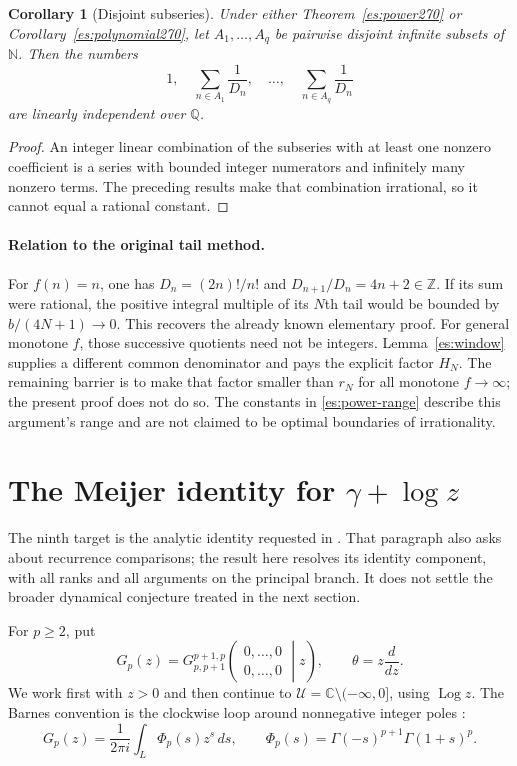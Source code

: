 \documentclass[11pt,a4paper]{article}
\numberwithin{equation}{section}
\newtheorem{corollary}[theorem]{Corollary}
\theoremstyle{definition}
\theoremstyle{remark}
\DeclareMathOperator{\Log}{Log}
\begin{document}
\begin{corollary}[Disjoint subseries]
\label{es:subseries270}
Under either Theorem~\ref{es:power270} or
Corollary~\ref{es:polynomial270}, let $A_1,\ldots,A_q$ be pairwise
disjoint infinite subsets of $\mathbb N$.  Then the numbers
\[
 1,\quad \sum_{n\in A_1}\frac1{D_n},\quad\ldots,\quad
 \sum_{n\in A_q}\frac1{D_n}
\]
are linearly independent over $\mathbb Q$.
\end{corollary}
\begin{proof}
An integer linear combination of the subseries with at least one
nonzero coefficient is a series with bounded integer numerators
and infinitely many nonzero terms.  The preceding results make
that combination irrational, so it cannot equal a rational constant.
\end{proof}

\paragraph{Relation to the original tail method.}
For $f(n)=n$, one has $D_n=(2n)!/n!$ and
$D_{n+1}/D_n=4n+2\in\mathbb Z$.  If its sum were rational, the
positive integral multiple of its $N$th tail would be bounded by
$b/(4N+1)\to0$.  This recovers the already known elementary proof.
For general monotone $f$, those successive quotients need not be
integers.  Lemma~\ref{es:window} supplies a different common
denominator and pays the explicit factor $H_N$.  The remaining
barrier is to make that factor smaller than $r_N$ for all monotone
$f\to\infty$; the present proof does not do so.  The constants in
\eqref{es:power-range} describe this argument's range and are not
claimed to be optimal boundaries of irrationality.



\section{The Meijer identity for \texorpdfstring{$\gamma+\log z$}{gamma + log z}}
\label{cmf:extension}

The ninth target is the analytic identity requested in
\cite[Section 9.2(1)]{CMF2026}. That paragraph also asks about
recurrence comparisons; the result here resolves its identity
component, with all ranks and all arguments on the principal branch.
It does not settle the broader dynamical conjecture treated in the
next section.

For $p\ge2$, put
\[
 G_p(z)=G^{p+1,p}_{p,p+1}
 \!\left(\begin{matrix}0,\ldots,0\\0,\ldots,0\end{matrix}
 \middle|z\right),\qquad \theta=z\frac{d}{dz}.
\]
We work first with $z>0$ and then continue to
$\mathscr U=\mathbb C\setminus(-\infty,0]$, using $\Log z$.
The Barnes convention is the clockwise loop around nonnegative
integer poles \cite[Section 16.17]{NISTDLMF}:
\begin{equation}\label{cmf:Barnes}
 G_p(z)=\frac1{2\pi i}\int_L\Phi_p(s)z^s\,ds,
 \qquad \Phi_p(s)=\Gamma(-s)^{p+1}\Gamma(1+s)^p.
\end{equation}
\end{document}

